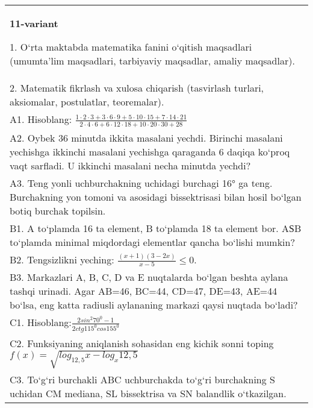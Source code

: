 \documentclass{article}
\begin{document}
\begin{tabular}{m{17cm}}
\textbf{11-variant}

1. O‘rta maktabda matematika fanini o‘qitish maqsadlari (umumta’lim maqsadlari, tarbiyaviy maqsadlar, amaliy maqsadlar). \\
2. Matematik fikrlash va xulosa chiqarish (tasvirlash turlari, aksiomalar, postulatlar, teoremalar). \\
A1. Hisoblang: \(\frac{1 \cdot 2 \cdot 3 + 3 \cdot 6 \cdot 9 + 5 \cdot 10 \cdot 15 + 7 \cdot 14 \cdot 21}{2 \cdot 4 \cdot 6 + 6 \cdot 12 \cdot 18 + 10 \cdot 20 \cdot 30 + 28}\) \\
A2. Oybek 36 minutda ikkita masalani yechdi. Birinchi masalani yechishga ikkinchi masalani yechishga qaraganda 6 daqiqa ko‘proq vaqt sarfladi. U ikkinchi masalani necha minutda yechdi? \\
A3. Teng yonli uchburchakning uchidagi burchagi 16° ga teng. Burchakning yon tomoni va asosidagi bissektrisasi bilan hosil bo‘lgan botiq burchak topilsin. \\
B1. A to‘plamda 16 ta element, B to‘plamda 18 ta element bor. AЅB to‘plamda minimal miqdordagi elementlar qancha bo‘lishi mumkin? \\
B2. Tengsizlikni yeching: \(\frac{ (x + 1) (3 - 2x) }{x - 5} \leq 0\). \\
B3. Markazlari A, B, C, D va E nuqtalarda bo‘lgan beshta aylana tashqi urinadi. Agar AB=46, BC=44, CD=47, DE=43, AE=44 bo‘lsa, eng katta radiusli aylananing markazi qaysi nuqtada bo‘ladi? \\
C1. Hisoblang:\(\frac{2sin^{2}70^{0} - 1}{2ctg115^{0}cos155^{0}}\) \\
C2. Funksiyaning aniqlanish sohasidan eng kichik sonni toping \(f (x) = \sqrt{log_{12,5}x - log_{x}12,5}\) \\
C3. To‘g‘ri burchakli ABC uchburchakda to‘g‘ri burchakning S uchidan CM mediana, SL bissektrisa va SN balandlik o‘tkazilgan. \\

\end{tabular}
\vspace{1cm}
\end{document}
